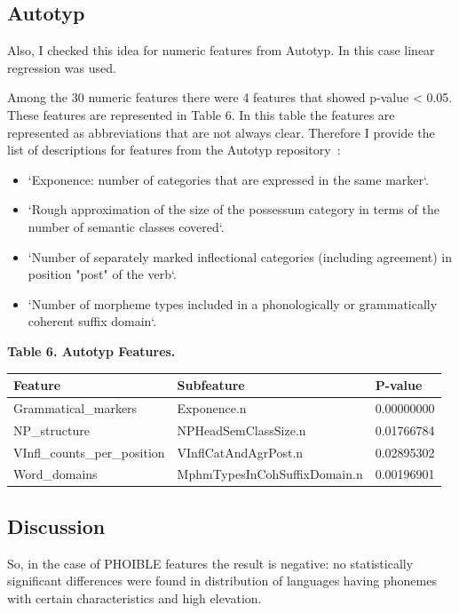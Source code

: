 \documentclass[a4paper,12pt]{article}
\begin{document}
\subsection{Autotyp}

Also, I checked this idea for numeric features from Autotyp. In this case linear regression was used.

Among the 30 numeric features there were 4 features that showed p-value < 0.05.
These features are represented in Table 6. In this table the features are represented as abbreviations that are not always clear. Therefore I provide the list of descriptions for features from the Autotyp repository~\parencite{autotyp}:
\begin{itemize}
 \item `Exponence: number of categories that are expressed in the same marker`.
 \item `Rough approximation of the size of the possessum category in terms of the number of semantic classes covered`.
 \item `Number of separately marked inflectional categories (including agreement) in position "post" of the verb`.
 \item `Number of morpheme types included in a phonologically or grammatically coherent suffix domain`.
\end{itemize}

\textbf{Table 6. Autotyp Features.}

\begin{tabular}{lll}
\toprule
Feature &                    Subfeature &     P-value \\
\midrule
Grammatical\_markers &                   Exponence.n &  0.00000000 \\
NP\_structure &          NPHeadSemClassSize.n &  0.01766784 \\
VInfl\_counts\_per\_position &          VInflCatAndAgrPost.n &  0.02895302 \\
Word\_domains &  MphmTypesInCohSuffixDomain.n &  0.00196901 \\
\bottomrule
\end{tabular}
\bigskip

\subsection{Discussion}

So, in the case of PHOIBLE features the result is negative: no statistically significant differences were found in distribution of languages having phonemes with certain characteristics and high elevation.
\end{document}
